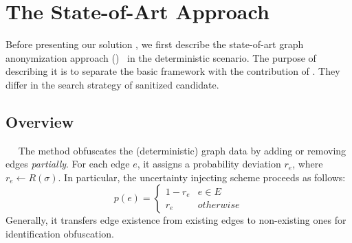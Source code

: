 \section{The State-of-Art Approach}
\label{sec:soa}
Before presenting our solution {\methodName}, we first describe the state-of-art graph anonymization approach ({\soaName})~\cite{Boldi_Injecting_2012} in the deterministic scenario. 
The purpose of describing it is to separate the basic framework with the contribution of {\methodName}. 
They differ in the search strategy of sanitized candidate.  

\subsection{Overview}~~
The {\soaName} method obfuscates the (deterministic) graph data by adding or removing edges \emph{partially}. 
For each edge $e$, it assigns a probability deviation $r_{e}$, where $r_{e} \leftarrow R(\sigma)$. 
In particular, the uncertainty injecting scheme proceeds as follows:
\begin{equation}
    p(e) =
    \begin{cases}
         1-r_{e}  & e \in E \\
         r_{e}    & otherwise 
    \end{cases}
    \label{eq:inject}
\end{equation}
Generally, it transfers edge existence from existing edges to non-existing ones for identification obfuscation.   

